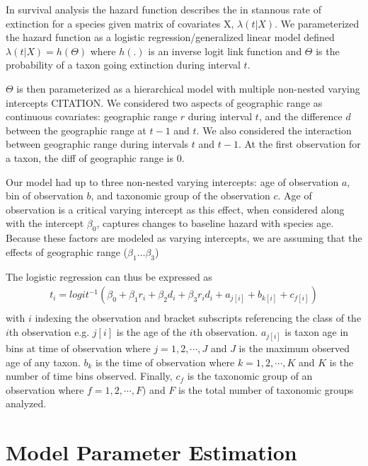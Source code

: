 \documentclass[12pt,letterpaper]{article}
\begin{document}
In survival analysis the hazard function describes the in stannous rate of extinction for a species given matrix of covariates X, \(\lambda(t | X)\). We parameterized the hazard function as a logistic regression/generalized linear model defined \(\lambda(t | X) = h(\Theta)\) where \(h(.)\) is an inverse logit link function and \(\Theta\) is the probability of a taxon going extinction during interval \(t\). 

\(\Theta\) is then parameterized as a hierarchical model with multiple non-nested varying intercepts CITATION. We considered two aspects of geographic range as continuous covariates: geographic range \(r\) during interval \(t\), and the difference \(d\) between the geographic range at \(t - 1\) and \(t\). We also considered the interaction between geographic range during intervals \(t\) and \(t - 1\). At the first observation for a taxon, the diff of geographic range is 0.

Our model had up to three non-nested varying intercepts: age of observation \(a\), bin of observation \(b\), and taxonomic group of the observation \(c\). Age of observation is a critical varying intercept as this effect, when considered along with the intercept \(\beta_{0}\), captures changes to baseline hazard with species age. Because these factors are modeled as varying intercepts, we are assuming that the effects of geographic range (\(\beta_{1} \dots \beta_{3}\))

The logistic regression can thus be expressed as 
\begin{equation}
  \begin{aligned}
    t_{i} = logit^{-1}(\beta_{0} + \beta_{1} r_{i} + \beta_{2} d_{i} + \beta_{3} r_{i} d_{i} + a_{j[i]} + b_{k[i]} + c_{f[i]}) \\
  \end{aligned}
  \label{eq:core}
\end{equation}
with \(i\) indexing the observation and bracket subscripts referencing the class of the \(i\)th observation e.g. \(j[i]\) is the age of the \(i\)th observation. \(a_{j[i]}\) is taxon age in bins at time of observation where \(j = 1, 2, \cdots, J\) and \(J\) is the maximum observed age of any taxon. \(b_{k}\) is the time of observation where \(k = 1, 2, \cdots, K\) and \(K\) is the number of time bins observed. Finally, \(c_{f}\) is the taxonomic group of an observation where \(f = 1, 2, \cdots, F)\) and \(F\) is the total number of taxonomic groups analyzed.



\section{Model Parameter Estimation}
\end{document}
